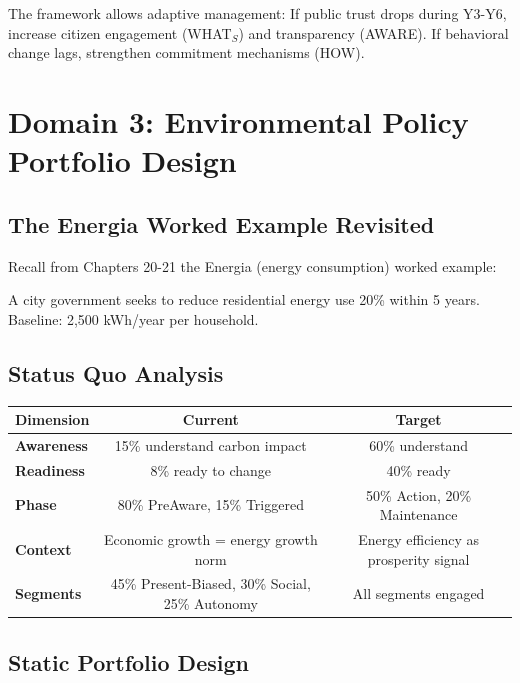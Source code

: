 The framework allows adaptive management: If public trust drops during Y3-Y6, increase citizen engagement (WHAT$_S$) and transparency (AWARE). If behavioral change lags, strengthen commitment mechanisms (HOW).


\section{Domain 3: Environmental Policy Portfolio Design}
\label{sec:environmental-portfolio}

\subsection{The Energia Worked Example Revisited}

Recall from Chapters 20-21 the Energia (energy consumption) worked example:

A city government seeks to reduce residential energy use 20\% within 5 years. Baseline: 2,500 kWh/year per household.

\subsection{Status Quo Analysis}

\begin{center}
\begin{tabular}{@{}lcc@{}}
\toprule
\textbf{Dimension} & \textbf{Current} & \textbf{Target} \\
\midrule
\textbf{Awareness} & 15\% understand carbon impact & 60\% understand \\
\textbf{Readiness} & 8\% ready to change & 40\% ready \\
\textbf{Phase} & 80\% PreAware, 15\% Triggered & 50\% Action, 20\% Maintenance \\
\textbf{Context} & Economic growth = energy growth norm & Energy efficiency as prosperity signal \\
\textbf{Segments} & 45\% Present-Biased, 30\% Social, 25\% Autonomy & All segments engaged \\
\midrule
\end{tabular}
\end{center}

\subsection{Static Portfolio Design}

